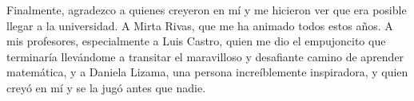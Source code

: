 \documentclass[upright, contnum]{umemoria}
\begin{document}
\begin{thanks}
Finalmente, agradezco a quienes creyeron en mí y me hicieron ver que era posible llegar a la universidad. A Mirta Rivas, que me ha animado todos estos años. A mis profesores, especialmente a Luis Castro, quien me dio el empujoncito que terminaría llevándome a transitar el maravilloso y desafiante camino de aprender matemática, y a Daniela Lizama, una persona increíblemente inspiradora, y quien creyó en mí y se la jugó antes que nadie. 


\end{thanks}

\cleardoublepage
\tableofcontents
\cleardoublepage
\listoftables
\cleardoublepage
\listoffigures

\mainmatter











\appendix

\end{document}
